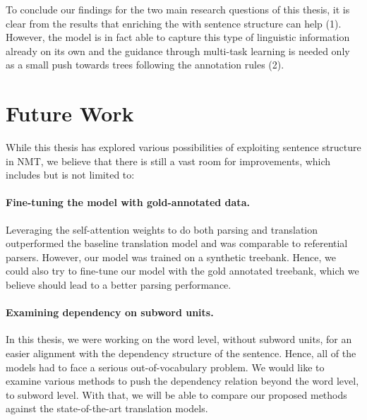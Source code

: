 To conclude our findings for the two main research questions of this thesis, it is clear from the results that enriching the \transformer with sentence structure can help (1).
However, the \transformer model is in fact able to capture this type of linguistic information already on its own and the guidance through multi-task learning is needed only as a small push towards trees following the annotation rules (2).


\section*{Future Work}

While this thesis has explored various possibilities of exploiting sentence structure in NMT, we believe that there is still a vast room for improvements, which includes but is not limited to:

\paragraph{Fine-tuning the \DepParse model with gold-annotated data.}
Leveraging the self-attention weights to do both parsing and translation outperformed the baseline translation model and was comparable to referential parsers.
However, our model was trained on a synthetic treebank.
Hence, we could also try to fine-tune our model with the gold annotated treebank, which we believe should lead to a better parsing performance.

\paragraph{Examining dependency on subword units.}
In this thesis, we were working on the word level, without subword units, for an easier alignment with the dependency structure of the sentence.
Hence, all of the models had to face a serious out-of-vocabulary problem.
We would like to examine various methods to push the dependency relation beyond the word level, to subword level.
With that, we will be able to compare our proposed methods against the state-of-the-art translation models.
